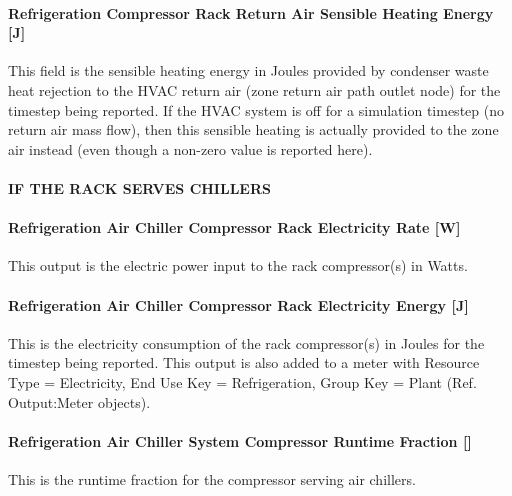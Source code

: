 \paragraph{Refrigeration Compressor Rack Return Air Sensible Heating Energy {[}J{]}}\label{refrigeration-compressor-rack-return-air-sensible-heating-energy-j}

This field is the sensible heating energy in Joules provided by condenser waste heat rejection to the HVAC return air (zone return air path outlet node) for the timestep being reported. If the HVAC system is off for a simulation timestep (no return air mass flow), then this sensible heating is actually provided to the zone air instead (even though a non-zero value is reported here).

\paragraph{IF THE RACK SERVES CHILLERS}\label{if-the-rack-serves-chillers}

\paragraph{Refrigeration Air Chiller Compressor Rack Electricity Rate {[}W{]}}\label{refrigeration-air-chiller-compressor-rack-electric-power-w}

This output is the electric power input to the rack compressor(s) in Watts.

\paragraph{Refrigeration Air Chiller Compressor Rack Electricity Energy {[}J{]}}\label{refrigeration-air-chiller-compressor-rack-electric-energy-j}

This is the electricity consumption of the rack compressor(s) in Joules for the timestep being reported. This output is also added to a meter with Resource Type = Electricity, End Use Key = Refrigeration, Group Key = Plant (Ref. Output:Meter objects).

\paragraph{Refrigeration Air Chiller System Compressor Runtime Fraction {[]}}\label{refrigeration-air-chiller-system-compressor-runtime-fraction}

This is the runtime fraction for the compressor serving air chillers.

